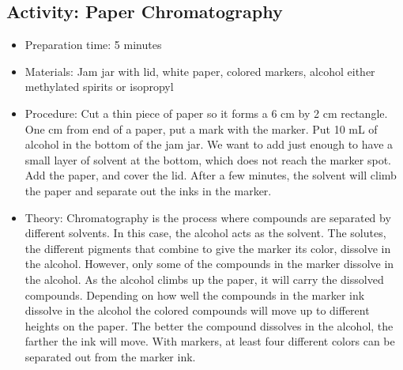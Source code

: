 \begin{itemize}
{\subsection{Activity: Paper Chromatography}
\begin{itemize}
\item{Preparation time: 5 minutes}
\item{Materials: Jam jar with lid, white paper, colored markers, alcohol either methylated spirits or isopropyl}
\item{Procedure: Cut a thin piece of paper so it forms a 6 cm by 2 cm rectangle. One cm from end of a paper, put a mark with the marker. Put 10 mL of alcohol in the bottom of the jam jar. We want to add just enough to have a small layer of solvent at the bottom, which does not reach the marker spot. Add the paper, and cover the lid. After a few minutes, the solvent will climb the paper and separate out the inks in the marker.}
\item{Theory: Chromatography is the process where compounds are separated by different solvents. In this case, the alcohol acts as the solvent. The solutes, the different pigments that combine to give the marker its color, dissolve in the alcohol. However, only some of the compounds in the marker dissolve in the alcohol. As the alcohol climbs up the paper, it will carry the dissolved compounds. Depending on how well the compounds in the marker ink dissolve in the alcohol the colored compounds will move up to different heights on the paper. The better the compound dissolves in the alcohol, the farther the ink will move. With markers, at least four different colors can be separated out from the marker ink. }
\end{itemize}

}
\end{itemize}
